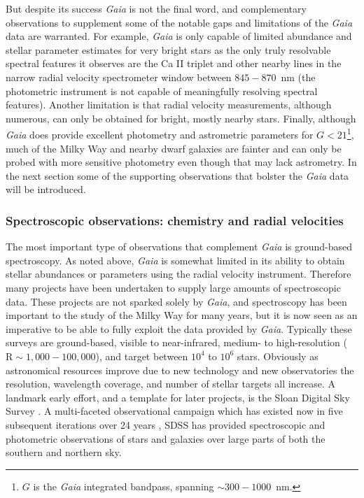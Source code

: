 But despite its success \textit{Gaia} is not the final word, and complementary observations to supplement some of the notable gaps and limitations of the \textit{Gaia} data are warranted. For example, \textit{Gaia} is only capable of limited abundance and stellar parameter estimates for very bright stars as the only truly resolvable spectral features it observes are the Ca II triplet and other nearby lines in the narrow radial velocity spectrometer window between $845-870$~nm (the photometric instrument is not capable of meaningfully resolving spectral features). Another limitation is that radial velocity measurements, although numerous, can only be obtained for bright, mostly nearby stars. Finally, although \textit{Gaia} does provide excellent photometry and astrometric parameters for $G < 21$\footnote{$G$ is the \textit{Gaia} integrated bandpass, spanning $\sim 300-1000$~nm.}, much of the Milky Way and nearby dwarf galaxies are fainter and can only be probed with more sensitive photometry even though that may lack astrometry. In the next section some of the supporting observations that bolster the \textit{Gaia} data will be introduced.

\subsubsection{Spectroscopic observations: chemistry and radial velocities}

The most important type of observations that complement \textit{Gaia} is ground-based spectroscopy. As noted above, \textit{Gaia} is somewhat limited in its ability to obtain stellar abundances or parameters using the radial velocity instrument. Therefore many projects have been undertaken to supply large amounts of spectroscopic data. These projects are not sparked solely by \textit{Gaia}, and spectroscopy has been important to the study of the Milky Way for many years, but it is now seen as an imperative to be able to fully exploit the data provided by \textit{Gaia}. Typically these surveys are ground-based, visible to near-infrared, medium- to high-resolution ($\mathrm{R} \sim 1,000-100,000$), and target between $10^{4}$ to $10^{6}$ stars. Obviously as astronomical resources improve due to new technology and new observatories the resolution, wavelength coverage, and number of stellar targets all increase. A landmark early effort, and a template for later projects, is the Sloan Digital Sky Survey \parencite[][]{sdss}. A multi-faceted observational campaign which has existed now in five subsequent iterations over 24 years \parencite[see ][for the third and fourth generations]{sdss3,sdss4}, SDSS has provided spectroscopic and photometric observations of stars and galaxies over large parts of both the southern and northern sky.

